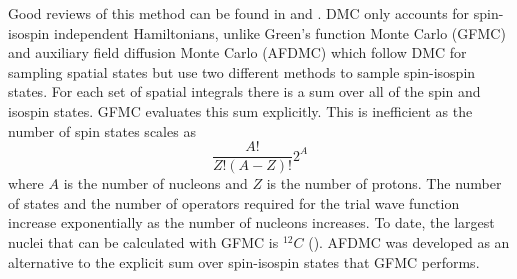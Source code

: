 Good reviews of this method can be found in \cite{foulkes2001} and  \cite{carlson2015}. DMC only accounts for spin-isospin independent Hamiltonians, unlike Green's function Monte Carlo (GFMC) and auxiliary field diffusion Monte Carlo (AFDMC) which follow DMC for sampling spatial states but use two different methods to sample spin-isospin states. For each set of spatial integrals there is a sum over all of the spin and isospin states. GFMC evaluates this sum explicitly. This is inefficient as the number of spin states scales as
\begin{equation}
   \frac{A!}{Z!(A-Z)!}2^A
\end{equation}
where $A$ is the number of nucleons and $Z$ is the number of protons.
The number of states and the number of operators required for the trial wave function increase exponentially as the number of nucleons increases. To date, the largest nuclei that can be calculated with GFMC is ${}^{12}C$ (\cite{lovato2013,lovato2014,lovato2015}). AFDMC was developed as an alternative to the explicit sum over spin-isospin states that GFMC performs.

